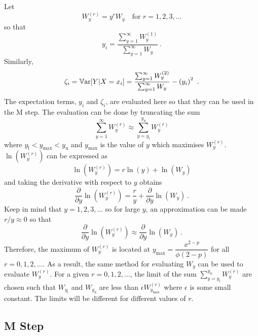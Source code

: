 Let
\begin{equation}
  W_y^{(r)} = y^r W_y \quad \text{for }r=1,2,3,\dotsc
\end{equation}
so that
\begin{equation}
  y_i = \frac{\sum_{y=1}^\infty W^{(1)}_y}{\sum_{y=1}^\infty W_y} \ .
\end{equation}
Similarly,
\begin{equation}
  \zeta_i = \operatorname{\mathbb{V}ar}[Y|X=x_i] = \frac{\sum_{y=1}^\infty W^{(2)}_y}{\sum_{y=1}^\infty W_y} - \left(y_i\right)^2
  \ .
\end{equation}
The expectation terms, $y_i$ and $\zeta_i$, are evaluated here so that they can be used in the M step. The evaluation can be done by truncating the sum
\begin{equation}
  \sum_{y=1}^\infty W^{(r)}_y \approx \sum_{y=y_\text{l}}^{y_\text{u}} W^{(r)}_y
\end{equation}
where $y_\text{l}<y_\text{max}<y_\text{u}$ and $y_\text{max}$ is the value of $y$ which maximises $W_y^{(r)}$. $\ln\left(W^{(r)}_y\right)$ can be expressed as
\begin{equation}
  \ln\left(W_y^{(r)}\right)=r\ln(y)+\ln(W_y)
\end{equation}
and taking the derivative with respect to $y$ obtains
\begin{equation}
  \frac{\partial }{\partial y} \ln\left(W_y^{(r)}\right) = \frac{r}{y } + \frac{\partial }{\partial y}\ln\left(W_y\right)
  \ .
\end{equation}
Keep in mind that $y=1,2,3,\dotsc$ so for large $y$, an approximation can be made $r/y\approx 0$ so that
\begin{equation}
  \frac{\partial }{\partial y} \ln\left(W_y^{(r)}\right)\approx \frac{\partial }{\partial y} \ln\left(W_y\right)
  \ .
\end{equation}
Therefore, the maximum of $W_y^{(r)}$ is located at $y_\text{max}=\dfrac{x^{2-p}}{\phi(2-p)}$ for all $r=0,1,2,\dotsc$. As a result, the same method for evaluating $W_y$ can be used to evaluate $W_y^{(r)}$. For a given $r=0,1,2,\dotsc$, the limit of the sum $\sum_{y=y_\text{l}}^{y_\text{u}} W^{(r)}_y$ are chosen such that $W_{y_\text{l}}$ and $W_{y_\text{u}}$ are less than $\epsilon W_{y_\text{max}}^{(r)}$ where $\epsilon$ is some small constant. The limits will be different for different values of $r$.

\subsection{M Step}

